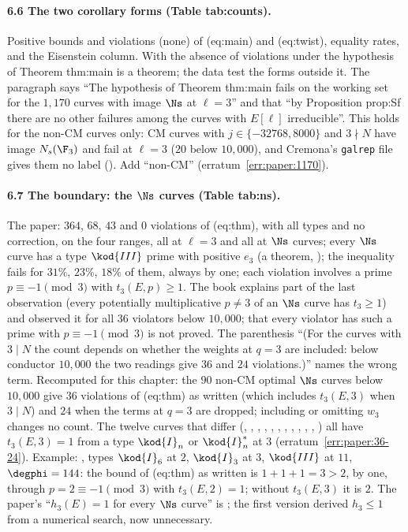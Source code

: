 \begin{sloppypar}
\paragraph{6.6 The two corollary forms (Table tab:counts).} Positive bounds and violations (none) of (eq:main) and (eq:twist), equality rates, and the Eisenstein column. With
 the absence of violations under the hypothesis of Theorem thm:main is a theorem; the data test the forms outside it. The paragraph says ``The hypothesis of
Theorem thm:main fails on the working set for the $1{,}170$ curves with image $\Ns$ at $\ell=3$'' and that ``by Proposition prop:Sf there are no other failures among the curves
with $E[\ell]$ irreducible''. This holds for the non-CM curves only: CM curves with $j\in\{-32768,8000\}$ and $3\nmid N$ have image $N_s(\F_3)$ and fail at $\ell=3$ ($20$ below $10{,}000$), and
Cremona's \texttt{galrep} file gives them no label (). Add ``non-CM'' (erratum~\ref{err:paper:1170}).

\paragraph{6.7 The boundary: the $\Ns$ curves (Table tab:ns).} The paper: $364$, $68$, $43$ and $0$ violations of (eq:thm), with all types and no correction, on the four ranges, all at $\ell=3$ and
all at $\Ns$ curves; every $\Ns$ curve has a type $\kod{III}$ prime with positive $e_3$ (a theorem, ); the inequality fails for $31\%$, $23\%$, $18\%$ of them, always
by one; each violation involves a prime $p\equiv-1\pmod3$ with $t_3(E,p)\ge1$. The book explains part of the last observation (every potentially multiplicative $p\ne3$ of an $\Ns$ curve has
$t_3\ge1$) and observed it for all $36$ violators below $10{,}000$; that every violator has such a prime with $p\equiv-1\pmod3$ is not proved. The parenthesis ``(For the curves with $3\mid N$
the count depends on whether the weights at $q=3$ are included: below conductor $10{,}000$ the two readings give $36$ and $24$ violations.)'' names the wrong term. Recomputed for this
chapter: the $90$ non-CM optimal $\Ns$ curves below $10{,}000$ give $36$ violations of (eq:thm) as written (which includes $t_3(E,3)$ when $3\mid N$) and $24$ when the terms at $q=3$ are dropped;
including or omitting $w_3$ changes no count. The twelve curves that differ (, , , , , , , ,
, , , ) all have $t_3(E,3)=1$ from a type $\kod{I}_n$ or $\kod{I}_n^*$ at $3$ (erratum~\ref{err:paper:36-24}). Example: , types $\kod{I}_6$ at $2$,
$\kod{I}_3$ at $3$, $\kod{III}$ at $11$, $\degphi=144$: the bound of (eq:thm) as written is $1+1+1=3>2$, by one, through $p=2\equiv-1\pmod3$ with $t_3(E,2)=1$; without $t_3(E,3)$ it is $2$. The
paper's ``$h_3(E)=1$ for every $\Ns$ curve'' is ; the first version derived $h_3\le1$ from a numerical search, now unnecessary.


\end{sloppypar}
